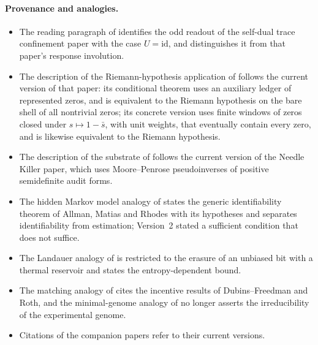 \paragraph{Provenance and analogies.}
\begin{itemize}
\item The reading paragraph of  identifies the odd
  readout of the self-dual trace confinement paper with the case
  \(U=\mathrm{id}\), and distinguishes it from that paper's response
  involution.
\item The description of the Riemann-hypothesis application of
   follows the current version of that paper: its conditional
  theorem uses an auxiliary ledger of represented zeros, and is
  equivalent to the Riemann hypothesis on the bare shell of all
  nontrivial zeros; its concrete version uses finite windows of zeros
  closed under \(s\mapsto1-\bar s\), with unit weights, that eventually
  contain every zero, and is likewise equivalent to the Riemann
  hypothesis.
\item The description of the substrate of  follows the current
  version of the Needle Killer paper, which uses Moore--Penrose
  pseudoinverses of positive semidefinite audit forms.
\item The hidden Markov model analogy of  states the
  generic identifiability theorem of Allman, Matias and Rhodes with its
  hypotheses and separates identifiability from estimation; Version~2
  stated a sufficient condition that does not suffice.
\item The Landauer analogy of  is restricted to the erasure of
  an unbiased bit with a thermal reservoir and states the
  entropy-dependent bound.
\item The matching analogy of  cites the incentive results of
  Dubins--Freedman and Roth, and the minimal-genome analogy of
   no longer asserts the irreducibility of the experimental
  genome.
\item Citations of the companion papers refer to their current versions.
\end{itemize}

